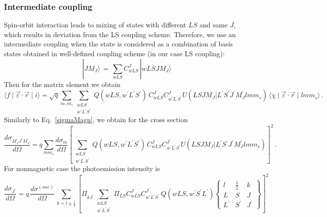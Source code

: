 \documentclass[a4paper,oneside,12pt]{extarticle}
\begin{document}
\subsubsection {Intermediate coupling}
%
Spin-orbit interaction leads to mixing of states with different $LS$ and same $J$, which results in deviation from the LS coupling scheme. Therefore, we use an intermediate coupling when the state is considered as a combination of basis states obtained in well-defined coupling scheme (in our case LS coupling):
$$
| JM_J \rangle \, = \, \sum_{wLS} C^J_{wLS} \, | wLSJM_J \rangle
$$
%
Then for the matrix element we obtain
%
\begin{equation}
\langle f \mid \vec{\varepsilon} \cdot \vec{r}  \mid i \rangle = \sqrt{q}  
\sum_{m,m_s} \sum_{\substack{wLS\\w^{\prime}L^{\prime} S^{\prime}}} Q(wLS,w^{\prime}L^{\prime} S^{\prime}) \, 
C^J_{wLS} C^{J^{\prime}}_{w^{\prime}L^{\prime} S^{\prime}}
U(L S J M_J | L^{\prime} S^{\prime} J^{\prime} M_J^{\prime} l m m_s) \,
\langle \chi \mid \vec{\varepsilon} \cdot \vec{r}  \mid lmm_s \rangle \,.
\end{equation}
%
Similarly to Eq.~\ref{sigmaMagn}, we obtain for the cross section
\begin{equation}
\frac{d \sigma_{M_J J^{\prime}M_J^{\prime}}}{d \Omega} = q \sum_{mm_s} \frac{d \sigma_m}{d \Omega}
\left[ \sum_{\substack{wLS\\w^{\prime}L^{\prime} S^{\prime}}} Q(wLS,w^{\prime}L^{\prime} S^{\prime}) \, 
C^J_{wLS} C^{J^{\prime}}_{w^{\prime}L^{\prime} S^{\prime}}
U(L S J M_J | L^{\prime} S^{\prime} J^{\prime} M_J^{\prime} l m m_s) \right]^2 \,.
\end{equation}
%
For nonmagnetic case the photoemission intensity is 
\begin{equation}
\frac{d \sigma_{J^{\prime}}}{d \Omega} = q \, \frac{d \sigma^{(one)}}{d \Omega} \,
\sum_{k=l\pm\frac{1}{2}} \left[ \Pi_{kJ^{\prime}}
\sum_{\substack{wLS\\w^{\prime}L^{\prime} S^{\prime}}} \Pi_{LS}
 C^{J}_{wLS} C^{J^{\prime}}_{w^{\prime}L^{\prime} S^{\prime}} \,
Q(wLS, w^{\prime}S^{\prime}L^{\prime}) 
\left \{
\begin{array}{ccc}
l & \frac{1}{2} & k \\[2mm]
L & S & J \\[2mm]
L^{\prime} & S^{\prime} & J^{\prime}
\end{array}
\right \} \right]^2 
\,
\end{equation}
\end{document}
